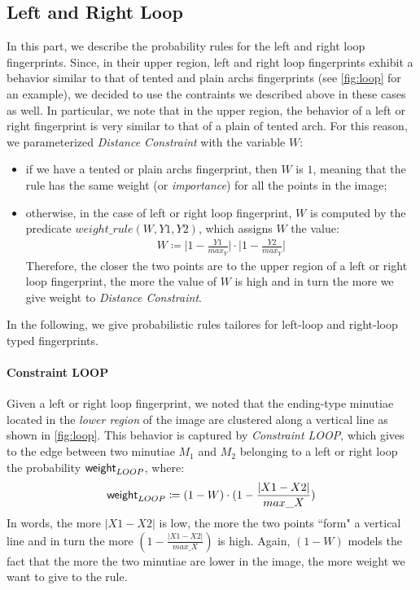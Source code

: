 \documentclass[8pt]{article}
\begin{document}
\subsection{Left and Right Loop}
In this part, we describe the probability rules for the left and right loop
fingerprints.  Since, in their upper region, left and right loop fingerprints
exhibit a behavior similar to that of tented and plain archs fingerprints (see
\cref{fig:loop} for an example), we decided to use the contraints we described
above in these cases as well. In particular, we note that in the upper region,
the behavior of a left or right fingerprint is very similar to that of a plain
of tented arch. For this reason, we parameterized \emph{Distance Constraint}
with the variable $W$:
  \begin{itemize}
    \item
      if we have a tented or plain archs fingerprint, then $W$ is $1$, meaning
      that the rule has the same weight (or \emph{importance}) for all the
      points in the image;
    \item
      otherwise, in the case of left or right loop fingerprint, $W$ is
      computed by the predicate $weight\_rule(W,Y1,Y2)$, which assigns 
      $W$ the value:
        \begin{align*}
          W \coloneqq 
          \Big\lvert 1-\frac{Y1}{max_Y} \Big\rvert 
          \cdot 
          \Big\lvert 1-\frac{Y2}{max_Y} \Big\rvert
        \end{align*}
      Therefore, the closer the two points are to the upper region of a left or
      right loop fingerprint, the more the value of $W$ is high and in turn the
      more we give weight to \emph{Distance Constraint}.
  \end{itemize}


In the following, we give probabilistic rules tailores for left-loop and
right-loop typed fingerprints.
\paragraph{Constraint LOOP}
Given a left or right loop fingerprint, we noted that the ending-type
minutiae located in the \emph{lower region} of the image are clustered along
a vertical line as shown in \cref{fig:loop}.
This behavior is captured by \emph{Constraint LOOP}, which gives to
the edge between two minutiae $M_1$ and $M_2$ belonging to a left or right loop
the probability $\textsf{weight}_{LOOP}$, where:
  \begin{align*}
    \textsf{weight}_{LOOP} \coloneqq
    (1-W)\cdot 
    (1-\frac{\lvert X1-X2 \rvert}{max\_X})
  \end{align*}
In words, the more $\lvert X1-X2 \rvert$ is low, the more the two points
``form" a vertical line and in turn the more $(1-\frac{\lvert X1-X2
\rvert}{max\_X})$ is high.  Again, $(1-W)$ models the fact that the more the
two minutiae are lower in the image, the more weight we want to give to the
rule.  
\end{document}

